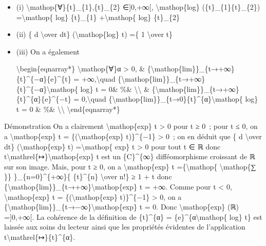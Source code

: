 \documentclass[]{article}
\begin{document}
\begin{itemize}
\item
  (i) \textbackslash{}mathop\{∀\}\{t\}\_\{1\},\{t\}\_\{2\} ∈{]}0,+∞{[},
  \textbackslash{}mathop\{log\} (\{t\}\_\{1\}\{t\}\_\{2\})
  =\textbackslash{}mathop\{ log\} \{t\}\_\{1\} +\textbackslash{}mathop\{
  log\} \{t\}\_\{2\}
\item
  (ii) \{ d \textbackslash{}over dt\} (\textbackslash{}mathop\{log\} t)
  =\{ 1 \textbackslash{}over t\}
\item
  (iii) On a également

  \textbackslash{}begin\{eqnarray*\} \textbackslash{}mathop\{∀\}α
  \textgreater{} 0, \&
  \{\textbackslash{}mathop\{lim\}\}\_\{t→+∞\}\{t\}\^{}\{−α\}\{e\}\^{}\{t\}
  = +∞,\textbackslash{}quad
  \{\textbackslash{}mathop\{lim\}\}\_\{t→+∞\}\{t\}\^{}\{−α\}\textbackslash{}mathop\{
  log\} t = 0\& \%\& \textbackslash{}\textbackslash{} \&
  \{\textbackslash{}mathop\{lim\}\}\_\{t→+∞\}\{t\}\^{}\{α\}\{e\}\^{}\{−t\}
  = 0,\textbackslash{}quad
  \{\textbackslash{}mathop\{lim\}\}\_\{t→0\}\{t\}\^{}\{α\}\textbackslash{}mathop\{
  log\} t = 0 \& \%\& \textbackslash{}\textbackslash{}
  \textbackslash{}end\{eqnarray*\}
\end{itemize}

Démonstration On a clairement \textbackslash{}mathop\{exp\} t
\textgreater{} 0 pour t ≥ 0~; pour t ≤ 0, on a
\textbackslash{}mathop\{exp\} t = \{(\textbackslash{}mathop\{exp\}
\textbar{}t\textbar{})\}\^{}\{−1\} \textgreater{} 0~; on en déduit que
\{ d \textbackslash{}over dt\} (\textbackslash{}mathop\{exp\} t)
=\textbackslash{}mathop\{ exp\} t \textgreater{} 0 pour tout t ∈ ℝ donc
t\textbackslash{}mathrel\{↦\}\textbackslash{}mathop\{exp\} t est un
\{C\}\^{}\{∞\} difféomorphisme croissant de ℝ sur son image. Mais, pour
t ≥ 0, on a \textbackslash{}mathop\{exp\} t =\{\textbackslash{}mathop\{
\textbackslash{}mathop\{∑ \}\} \}\_\{n=0\}\^{}\{+∞\}\{ \{t\}\^{}\{n\}
\textbackslash{}over n!\} ≥ 1 + t donc
\{\textbackslash{}mathop\{lim\}\}\_\{t→+∞\}\textbackslash{}mathop\{exp\}
t = +∞. Comme pour t \textless{} 0, \textbackslash{}mathop\{exp\} t =
\{(\textbackslash{}mathop\{exp\} \textbar{}t\textbar{})\}\^{}\{−1\}
\textgreater{} 0, on a
\{\textbackslash{}mathop\{lim\}\}\_\{t→−∞\}\textbackslash{}mathop\{exp\}
t = 0. Donc \textbackslash{}mathop\{exp\} (ℝ) ={]}0,+∞{[}. La cohérence
de la définition de \{t\}\^{}\{α\} =
\{e\}\^{}\{α\textbackslash{}mathop\{ log\} t\} est laissée aux soins du
lecteur ainsi que les propriétés évidentes de l'application
t\textbackslash{}mathrel\{↦\}\{t\}\^{}\{α\}.
\end{document}

